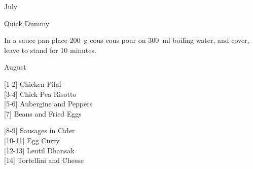 \begin{menu}{July}
\begin{recipe}{1}{Quick Dummy}
\begin{ingredients}
		\end{ingredients}
	
	
    \begin{instructions}
    \item 
    In a
    sauce pan 
    place
    200~g  cous cous
    pour on
    300~ml  boiling water,
    and cover, leave to stand for 10 minutes.
  
    \end{instructions}
    \end{recipe}%
  
    \clearpage
    \end{menu}
	
		\begin{menu}{August}
    
    \begin{recipelist}
    
        {\scriptsize[1-2]} Chicken Pilaf\\
        {\scriptsize[3-4]} Chick Pea Risotto\\
        {\scriptsize[5-6]} Aubergine and Peppers\\
        {\scriptsize[7]} Beans and Fried Eggs\\%
    \end{recipelist}%
    \begin{recipelist}
    
        {\scriptsize[8-9]} Sausages in Cider\\
        {\scriptsize[10-11]} Egg Curry\\
        {\scriptsize[12-13]} Lentil Dhansak\\
        {\scriptsize[14]} Tortellini and Cheese\\%
    \end{recipelist}\par%
  

\end{menu}
